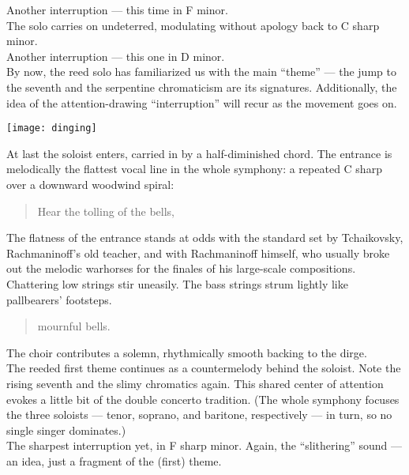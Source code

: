\documentclass{beamer}
\begin{document}
\begin{frame} 
  Another interruption --- this time in F minor. 
  \pause \\ 
  The solo carries on undeterred, modulating without apology back to C sharp minor. 
  \pause \\ 
  Another interruption --- this one in D minor. 
  \pause \\ 
  By now, the reed solo has familiarized us with the main ``theme''  --- the jump to the seventh and the serpentine chromaticism are its signatures. Additionally, the idea of the attention-drawing ``interruption'' will recur as the movement goes on. 
\end{frame} 

\begin{frame}
  \begin{center} 
    \texttt{[image: dinging]}
  \end{center} 
  At last the soloist enters, carried in by a half-diminished chord. The entrance is melodically the flattest vocal line in the whole symphony: a repeated C sharp over a downward woodwind spiral: 
  \pause 
  \begin{quote} 
    Hear{\pause} the{\pause} toll{\pause}ing{\pause} of{\pause} the{\pause} bells,
  \end{quote} 
\end{frame}

\begin{frame} 
  The flatness of the entrance stands at odds with the standard set by Tchaikovsky, Rachmaninoff's old teacher, and with Rachmaninoff himself, who usually broke out the melodic warhorses for the finales of his large-scale compositions. 
  \pause \\ 
  Chattering low strings stir uneasily. The bass strings strum lightly like pallbearers' footsteps. 
  \pause 
  \begin{quote} 
    mourn{\pause}ful{\pause} bells. 
  \end{quote} 
\end{frame} 

\begin{frame} 
  The choir contributes a solemn, rhythmically smooth backing to the dirge.
  \pause \\ 
  The reeded first theme continues as a countermelody behind the soloist. Note the rising seventh and the slimy chromatics again. This shared center of attention evokes a little bit of the double concerto tradition. (The whole symphony focuses the three soloists --- tenor, soprano, and baritone, respectively --- in turn, so no single singer dominates.) 
  \pause \\ 
  The sharpest interruption yet, in F sharp minor. Again, the ``slithering'' sound --- an idea, just a fragment of the (first) theme. 
\end{frame} 
\end{document}
